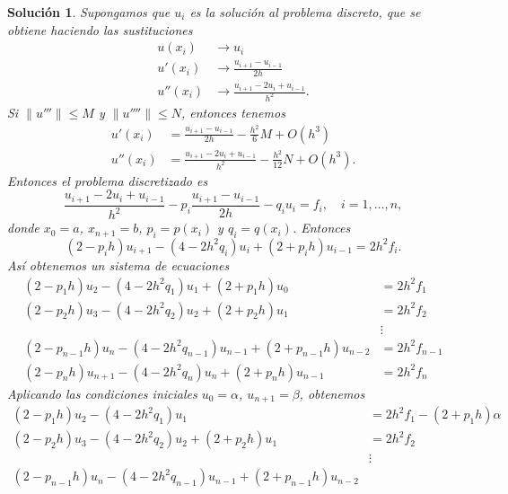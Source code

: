 \documentclass[11pt]{article}
\newtheorem*{sol}{Solución}
\begin{document}
\begin{sol}
  Supongamos que $u_i$ es la solución al problema discreto, que se
  obtiene haciendo las sustituciones
  \begin{align}
    u(x_i)
    &\to
    u_i
    \\
    u'(x_i)
    &\to
    \frac{u_{i+1}-u_{i-1}}{2h}
    \\
    u''(x_i)
    &\to
    \frac{u_{i+1}-2u_{i}+u_{i-1}}{h^{2}}
  .\end{align}
  Si $\|u'''\|\leq M$ y $\|u''''\|\leq N$, entonces tenemos
  \begin{align}
    u'(x_i)
    &= 
    \frac{u_{i+1}-u_{i-1}}{2h}
    - \frac{h^{2}}{6}M
    + O(h^{3})
    \\
    u''(x_i)
    &=
    \frac{u_{i+1}-2u_{i}+u_{i-1}}{h^{2}}
    - \frac{h^{2}}{12}N
    + O(h^{3})
  .\end{align}
  Entonces el problema discretizado es
  \begin{equation}
    \frac{u_{i+1}-2u_{i}+u_{i-1}}{h^{2}}
    - p_i
    \frac{u_{i+1}-u_{i-1}}{2h}
    - q_i
    u_i
    =
    f_i, \quad i=1,\dots,n
  ,\end{equation}
  donde $x_0=a$, $x_{n+1}=b$, $p_i=p(x_i)$ y $q_i=q(x_i)$.
  Entonces
  \begin{equation}
    (2-p_ih)u_{i+1}-(4-2h^{2}q_i)u_{i}+(2 + p_i h)u_{i-1}
    =
    2h^{2}f_i
  .\end{equation}
  Así
  obtenemos un sistema de ecuaciones
  \begin{align}
    (2-p_1h)u_{2}-(4-2h^{2}q_1)u_{1}+(2 + p_1 h)u_{0}
    &=
    2h^{2}f_1
    \\
    (2-p_2h)u_{3}-(4-2h^{2}q_2)u_{2}+(2 + p_2 h)u_{1}
    &=
    2h^{2}f_2
    \\
    &\vdots
    \\
    (2-p_{n-1}h)u_{n}-(4-2h^{2}q_{n-1})u_{n-1}+(2 + p_{n-1} h)u_{n-2}
    &=
    2h^{2}f_{n-1}
    \\
    (2-p_nh)u_{n+1}-(4-2h^{2}q_n)u_{n}+(2 + p_n h)u_{n-1}
    &=
    2h^{2}f_n
  \end{align}
  Aplicando las condiciones iniciales $u_0=\alpha$, $u_{n+1}=\beta$,
  obtenemos
  \begin{align}
    (2-p_1h)u_{2}-(4-2h^{2}q_1)u_{1}
    &=
    2h^{2}f_1
    -(2 + p_1 h)\alpha
    \\
    (2-p_2h)u_{3}-(4-2h^{2}q_2)u_{2}+(2 + p_2 h)u_{1}
    &=
    2h^{2}f_2
    \\
    &\vdots
    \\
    (2-p_{n-1}h)u_{n}-(4-2h^{2}q_{n-1})u_{n-1}+(2 + p_{n-1} h)u_{n-2}

\end{align}
\end{sol}
\end{document}
